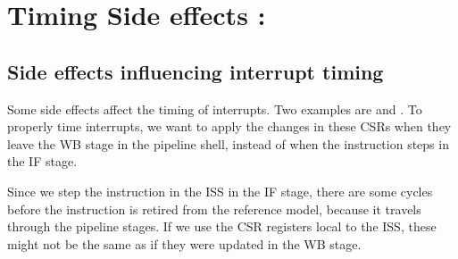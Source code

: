 %
%
%
%
%
%
%
%
%
%





\section{Timing Side effects : }
\label{sec:ps_side-effects}

\subsection{Side effects influencing interrupt timing}

Some side effects affect the timing of interrupts. Two examples are  and . To properly time interrupts, we want to apply the changes in these CSRs when they leave the WB stage in the pipeline shell, instead of when the instruction steps in the IF stage.


Since we step the instruction in the ISS in the IF stage, there are some cycles before the instruction is retired from the reference model, because it travels through the pipeline stages. If we use the CSR registers local to the ISS, these might not be the same as if they were updated in the WB stage.

